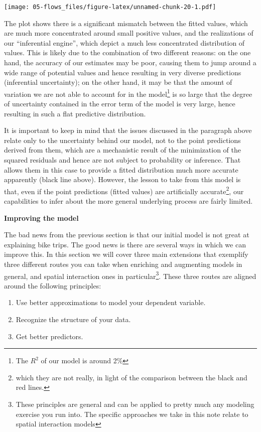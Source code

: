 \documentclass[
]{book}
\providecommand{\tightlist}{%
  \setlength{\itemsep}{0pt}\setlength{\parskip}{0pt}}
\begin{document}
\texttt{[image: 05-flows\_files/figure-latex/unnamed-chunk-20-1.pdf]}

The plot shows there is a significant mismatch between the fitted values, which are much more concentrated around small positive values, and the realizations of our ``inferential engine'', which depict a much less concentrated distribution of values. This is likely due to the combination of two different reasons: on the one hand, the accuracy of our estimates may be poor, causing them to jump around a wide range of potential values and hence resulting in very diverse predictions (inferential uncertainty); on the other hand, it may be that the amount of variation we are not able to account for in the model\footnote{The \(R^2\) of our model is around 2\%} is so large that the degree of uncertainty contained in the error term of the model is very large, hence resulting in such a flat predictive distribution.

It is important to keep in mind that the issues discussed in the paragraph above relate only to the uncertainty behind our model, not to the point predictions derived from them, which are a mechanistic result of the minimization of the squared residuals and hence are not subject to probability or inference. That allows them in this case to provide a fitted distribution much more accurate apparently (black line above). However, the lesson to take from this model is that, even if the point predictions (fitted values) are artificially accurate\footnote{which they are not really, in light of the comparison between the black and red lines.}, our capabilities to infer about the more general underlying process are fairly limited.

\textbf{Improving the model}

The bad news from the previous section is that our initial model is not great at explaining bike trips. The good news is there are several ways in which we can improve this. In this section we will cover three main extensions that exemplify three different routes you can take when enriching and augmenting models in general, and spatial interaction ones in particular\footnote{These principles are general and can be applied to pretty much any modeling exercise you run into. The specific approaches we take in this note relate to spatial interaction models}. These three routes are aligned around the following principles:

\begin{enumerate}
\def\labelenumi{\arabic{enumi}.}
\tightlist
\item
  Use better approximations to model your dependent variable.
\item
  Recognize the structure of your data.
\item
  Get better predictors.
\end{enumerate}
\end{document}
